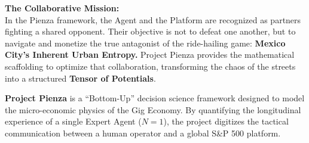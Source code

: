 \vspace{0.5cm}

\noindent \textbf{The Collaborative Mission:} \\
In the Pienza framework, the Agent and the Platform are recognized as partners fighting a shared opponent. Their objective is not to defeat one another, but to navigate and monetize the true antagonist of the ride-hailing game: \textbf{Mexico City’s Inherent Urban Entropy.} Project Pienza provides the mathematical scaffolding to optimize that collaboration, transforming the chaos of the streets into a structured \textbf{Tensor of Potentials}.

\noindent \textbf{Project Pienza} is a ``Bottom-Up'' decision science framework designed to model the micro-economic physics of the Gig Economy. By quantifying the longitudinal experience of a single Expert Agent ($N=1$), the project digitizes the tactical communication between a human operator and a global S\&P 500 platform.

\vspace{0.5cm}

